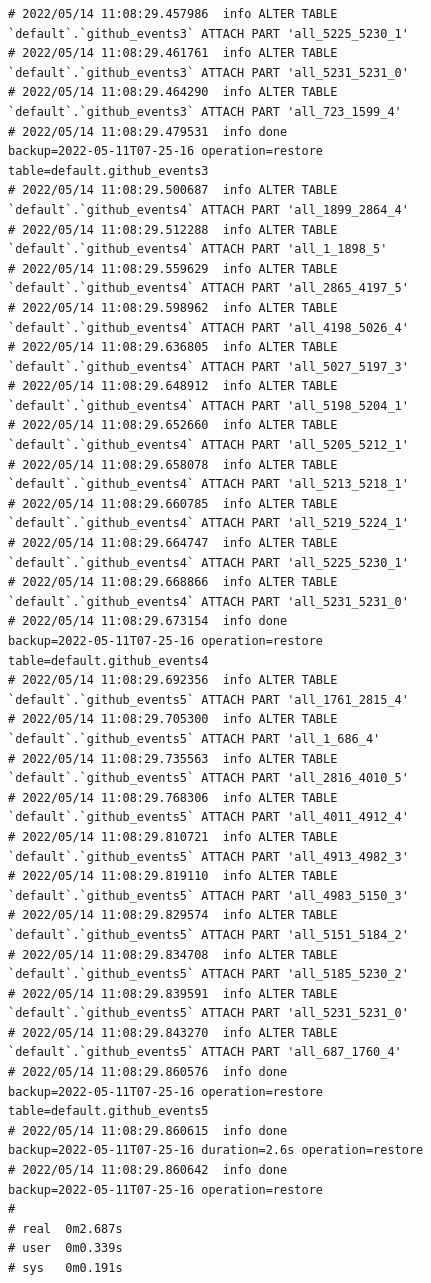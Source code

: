 \begin{verbatim}
# 2022/05/14 11:08:29.457986  info ALTER TABLE `default`.`github_events3` ATTACH PART 'all_5225_5230_1'
# 2022/05/14 11:08:29.461761  info ALTER TABLE `default`.`github_events3` ATTACH PART 'all_5231_5231_0'
# 2022/05/14 11:08:29.464290  info ALTER TABLE `default`.`github_events3` ATTACH PART 'all_723_1599_4'
# 2022/05/14 11:08:29.479531  info done                      backup=2022-05-11T07-25-16 operation=restore table=default.github_events3
# 2022/05/14 11:08:29.500687  info ALTER TABLE `default`.`github_events4` ATTACH PART 'all_1899_2864_4'
# 2022/05/14 11:08:29.512288  info ALTER TABLE `default`.`github_events4` ATTACH PART 'all_1_1898_5'
# 2022/05/14 11:08:29.559629  info ALTER TABLE `default`.`github_events4` ATTACH PART 'all_2865_4197_5'
# 2022/05/14 11:08:29.598962  info ALTER TABLE `default`.`github_events4` ATTACH PART 'all_4198_5026_4'
# 2022/05/14 11:08:29.636805  info ALTER TABLE `default`.`github_events4` ATTACH PART 'all_5027_5197_3'
# 2022/05/14 11:08:29.648912  info ALTER TABLE `default`.`github_events4` ATTACH PART 'all_5198_5204_1'
# 2022/05/14 11:08:29.652660  info ALTER TABLE `default`.`github_events4` ATTACH PART 'all_5205_5212_1'
# 2022/05/14 11:08:29.658078  info ALTER TABLE `default`.`github_events4` ATTACH PART 'all_5213_5218_1'
# 2022/05/14 11:08:29.660785  info ALTER TABLE `default`.`github_events4` ATTACH PART 'all_5219_5224_1'
# 2022/05/14 11:08:29.664747  info ALTER TABLE `default`.`github_events4` ATTACH PART 'all_5225_5230_1'
# 2022/05/14 11:08:29.668866  info ALTER TABLE `default`.`github_events4` ATTACH PART 'all_5231_5231_0'
# 2022/05/14 11:08:29.673154  info done                      backup=2022-05-11T07-25-16 operation=restore table=default.github_events4
# 2022/05/14 11:08:29.692356  info ALTER TABLE `default`.`github_events5` ATTACH PART 'all_1761_2815_4'
# 2022/05/14 11:08:29.705300  info ALTER TABLE `default`.`github_events5` ATTACH PART 'all_1_686_4'
# 2022/05/14 11:08:29.735563  info ALTER TABLE `default`.`github_events5` ATTACH PART 'all_2816_4010_5'
# 2022/05/14 11:08:29.768306  info ALTER TABLE `default`.`github_events5` ATTACH PART 'all_4011_4912_4'
# 2022/05/14 11:08:29.810721  info ALTER TABLE `default`.`github_events5` ATTACH PART 'all_4913_4982_3'
# 2022/05/14 11:08:29.819110  info ALTER TABLE `default`.`github_events5` ATTACH PART 'all_4983_5150_3'
# 2022/05/14 11:08:29.829574  info ALTER TABLE `default`.`github_events5` ATTACH PART 'all_5151_5184_2'
# 2022/05/14 11:08:29.834708  info ALTER TABLE `default`.`github_events5` ATTACH PART 'all_5185_5230_2'
# 2022/05/14 11:08:29.839591  info ALTER TABLE `default`.`github_events5` ATTACH PART 'all_5231_5231_0'
# 2022/05/14 11:08:29.843270  info ALTER TABLE `default`.`github_events5` ATTACH PART 'all_687_1760_4'
# 2022/05/14 11:08:29.860576  info done                      backup=2022-05-11T07-25-16 operation=restore table=default.github_events5
# 2022/05/14 11:08:29.860615  info done                      backup=2022-05-11T07-25-16 duration=2.6s operation=restore
# 2022/05/14 11:08:29.860642  info done                      backup=2022-05-11T07-25-16 operation=restore
#
# real	0m2.687s
# user	0m0.339s
# sys	0m0.191s
\end{verbatim}

